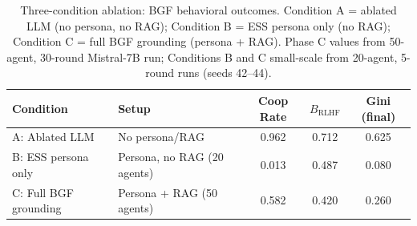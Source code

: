 \begin{table}[ht]
\centering
\caption{Three-condition ablation: BGF behavioral outcomes. Condition A = ablated LLM (no persona, no RAG); Condition B = ESS persona only (no RAG); Condition C = full BGF grounding (persona + RAG). Phase C values from 50-agent, 30-round Mistral-7B run; Conditions B and C small-scale from 20-agent, 5-round runs (seeds 42--44).}
\label{tab:three_condition}
\begin{tabular}{llccc}
\toprule
  Condition & Setup & Coop Rate & $B_{\mathrm{RLHF}}$ & Gini (final) \\
\midrule
  A: Ablated LLM & No persona/RAG & 0.962 & 0.712 & 0.625 \\
  B: ESS persona only & Persona, no RAG (20 agents) & 0.013 & 0.487 & 0.080 \\
  C: Full BGF grounding & Persona + RAG (50 agents) & 0.582 & 0.420 & 0.260 \\
\bottomrule
\end{tabular}
\end{table}